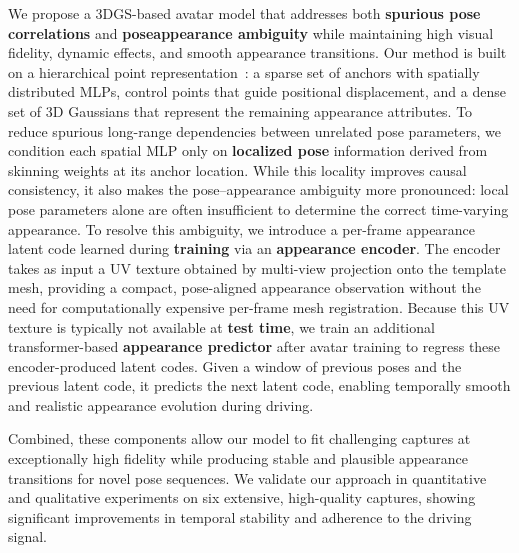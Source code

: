 \documentclass[runningheads]{llncs}
\newcommand{\todo}[1]{\textcolor{todo_color}{#1}}
\begin{document}

We propose a 3DGS-based avatar model that addresses both \textbf{spurious pose correlations} and \textbf{pose\textendash\allowbreak appearance ambiguity} while maintaining high visual fidelity, dynamic effects, and smooth appearance transitions.
Our method is built on a hierarchical point representation~\cite{zhan2025spatialmlps}: a sparse set of anchors with spatially distributed MLPs, control points that guide positional displacement, and a dense set of 3D Gaussians that represent the remaining appearance attributes.
To reduce spurious long-range dependencies between unrelated pose parameters, we condition each spatial MLP only on \textbf{localized pose} information derived from skinning weights at its anchor location.
While this locality improves causal consistency, it also makes the pose--appearance ambiguity more pronounced: local pose parameters alone are often insufficient to determine the correct time-varying appearance.
To resolve this ambiguity, we introduce a per-frame appearance latent code learned during \textbf{training} via an \textbf{appearance encoder}.
The encoder takes as input a UV texture obtained by multi-view projection onto the template mesh, providing a compact, pose-aligned appearance observation without the need for computationally expensive per-frame mesh registration.
Because this UV texture is typically not available at \textbf{test time}, we train an additional transformer-based \textbf{appearance predictor} after avatar training to regress these encoder-produced latent codes.
Given a window of previous poses and the previous latent code, it predicts the next latent code, enabling temporally smooth and realistic appearance evolution during driving.

Combined, these components allow our model to fit challenging captures at exceptionally high fidelity while producing stable and plausible appearance transitions for novel pose sequences.
We validate our approach in quantitative and qualitative experiments on six extensive, high-quality captures, showing  significant improvements in temporal stability and adherence to the driving signal.
\end{document}
